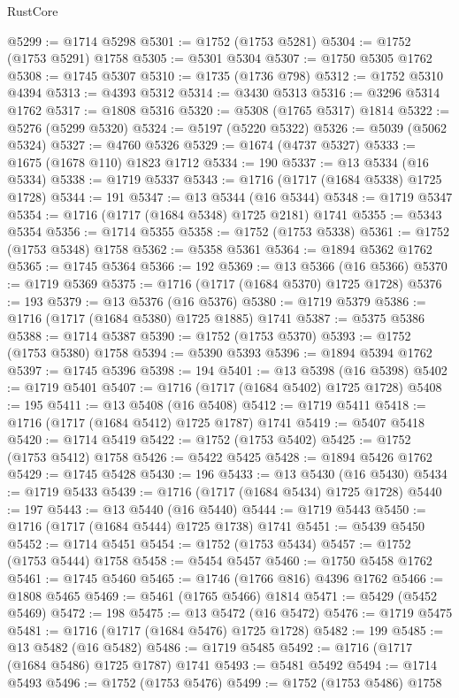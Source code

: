 \begin{lexlean}{RustCore}
\begin{coremodule}
@5299 := @1714 @5298
@5301 := @1752 (@1753 @5281)
@5304 := @1752 (@1753 @5291) @1758
@5305 := @5301 @5304
@5307 := @1750 @5305 @1762
@5308 := @1745 @5307
@5310 := @1735 (@1736 @798)
@5312 := @1752 @5310 @4394
@5313 := @4393 @5312
@5314 := @3430 @5313
@5316 := @3296 @5314 @1762
@5317 := @1808 @5316
@5320 := @5308 (@1765 @5317) @1814
@5322 := @5276 (@5299 @5320)
@5324 := @5197 (@5220 @5322)
@5326 := @5039 (@5062 @5324)
@5327 := @4760 @5326
@5329 := @1674 (@4737 @5327)
@5333 := @1675 (@1678 @110) @1823 @1712
@5334 := 190
@5337 := @13 @5334 (@16 @5334)
@5338 := @1719 @5337
@5343 := @1716 (@1717 (@1684 @5338) @1725 @1728)
@5344 := 191
@5347 := @13 @5344 (@16 @5344)
@5348 := @1719 @5347
@5354 := @1716 (@1717 (@1684 @5348) @1725 @2181) @1741
@5355 := @5343 @5354
@5356 := @1714 @5355
@5358 := @1752 (@1753 @5338)
@5361 := @1752 (@1753 @5348) @1758
@5362 := @5358 @5361
@5364 := @1894 @5362 @1762
@5365 := @1745 @5364
@5366 := 192
@5369 := @13 @5366 (@16 @5366)
@5370 := @1719 @5369
@5375 := @1716 (@1717 (@1684 @5370) @1725 @1728)
@5376 := 193
@5379 := @13 @5376 (@16 @5376)
@5380 := @1719 @5379
@5386 := @1716 (@1717 (@1684 @5380) @1725 @1885) @1741
@5387 := @5375 @5386
@5388 := @1714 @5387
@5390 := @1752 (@1753 @5370)
@5393 := @1752 (@1753 @5380) @1758
@5394 := @5390 @5393
@5396 := @1894 @5394 @1762
@5397 := @1745 @5396
@5398 := 194
@5401 := @13 @5398 (@16 @5398)
@5402 := @1719 @5401
@5407 := @1716 (@1717 (@1684 @5402) @1725 @1728)
@5408 := 195
@5411 := @13 @5408 (@16 @5408)
@5412 := @1719 @5411
@5418 := @1716 (@1717 (@1684 @5412) @1725 @1787) @1741
@5419 := @5407 @5418
@5420 := @1714 @5419
@5422 := @1752 (@1753 @5402)
@5425 := @1752 (@1753 @5412) @1758
@5426 := @5422 @5425
@5428 := @1894 @5426 @1762
@5429 := @1745 @5428
@5430 := 196
@5433 := @13 @5430 (@16 @5430)
@5434 := @1719 @5433
@5439 := @1716 (@1717 (@1684 @5434) @1725 @1728)
@5440 := 197
@5443 := @13 @5440 (@16 @5440)
@5444 := @1719 @5443
@5450 := @1716 (@1717 (@1684 @5444) @1725 @1738) @1741
@5451 := @5439 @5450
@5452 := @1714 @5451
@5454 := @1752 (@1753 @5434)
@5457 := @1752 (@1753 @5444) @1758
@5458 := @5454 @5457
@5460 := @1750 @5458 @1762
@5461 := @1745 @5460
@5465 := @1746 (@1766 @816) @4396 @1762
@5466 := @1808 @5465
@5469 := @5461 (@1765 @5466) @1814
@5471 := @5429 (@5452 @5469)
@5472 := 198
@5475 := @13 @5472 (@16 @5472)
@5476 := @1719 @5475
@5481 := @1716 (@1717 (@1684 @5476) @1725 @1728)
@5482 := 199
@5485 := @13 @5482 (@16 @5482)
@5486 := @1719 @5485
@5492 := @1716 (@1717 (@1684 @5486) @1725 @1787) @1741
@5493 := @5481 @5492
@5494 := @1714 @5493
@5496 := @1752 (@1753 @5476)
@5499 := @1752 (@1753 @5486) @1758

\end{coremodule}
\end{lexlean}
